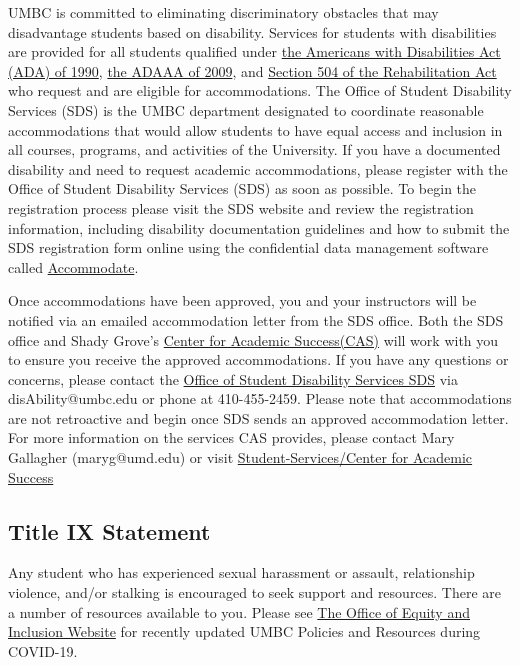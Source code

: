 \documentclass[11pt]{article}
\begin{document}
UMBC is committed to eliminating discriminatory obstacles that may disadvantage students based on disability. Services for students with disabilities are provided for all students qualified under \href{https://en.wikipedia.org/wiki/Americans_with_Disabilities_Act_of_1990}{the Americans with Disabilities Act (ADA) of 1990}, \href{https://en.wikipedia.org/wiki/ADA_Amendments_Act_of_2008}{the ADAAA of 2009}, and \href{https://en.wikipedia.org/wiki/Section_504_of_the_Rehabilitation_Act}{Section 504 of the Rehabilitation Act} who request and are eligible for accommodations. The Office of Student Disability Services (SDS) is the UMBC department designated to coordinate reasonable accommodations that would allow students to have equal access and inclusion in all courses, programs, and activities of the University.
If you have a documented disability and need to request academic accommodations, please register with the Office of Student Disability Services (SDS) as soon as possible. To begin the registration process please visit the SDS website and review the registration information, including disability documentation guidelines and how to submit the SDS registration form online using the confidential data management software called \href{https://sds.umbc.edu/accommodations/registering-with-sds/}{Accommodate}. 

Once accommodations have been approved, you and your instructors will be notified via an emailed accommodation letter from the SDS office.  Both the SDS office and Shady Grove's \href{https://shadygrove.umd.edu/student-services/center-for-academic-success}{Center for Academic Success(CAS)} will work with you to ensure you receive the approved accommodations. If you have any questions or concerns, please contact the \href{https://sds.umbc.edu/}{Office of Student Disability Services SDS} via disAbility@umbc.edu or phone at 410-455-2459. Please note that accommodations are not retroactive and begin once SDS sends an approved accommodation letter.
For more information on the services CAS provides, please contact Mary Gallagher (maryg@umd.edu) or visit \href{https://shadygrove.umd.edu/student-services/center-for-academic-success}{Student-Services/Center for  Academic Success}

\subsection*{Title IX Statement}
Any student who has experienced sexual harassment or assault, relationship violence, and/or stalking is encouraged to seek support and resources. There are a number of resources available to you. Please see \href{https://oei.umbc.edu/sample-title-ix-responsible-employee-syllabus-language/}{The Office of Equity and Inclusion Website} for recently updated UMBC Policies and Resources during COVID-19.
\end{document}
